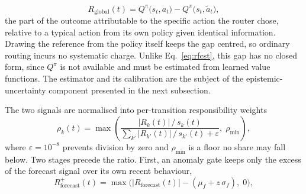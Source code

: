 \documentclass{article} %
\begin{document}
\begin{equation}
R_{\text{global}}(t)=Q^{\pi}\!\big(s_t,a_t\big)-Q^{\pi}\!\big(s_t,\tilde{a}_t\big),
\label{eq:rglobal}
\end{equation}
the part of the outcome attributable to the specific action the router chose, relative to a typical action from its own policy given identical information. Drawing the reference from the policy itself keeps the gap centred, so ordinary routing incurs no systematic charge. Unlike Eq.~\ref{eq:rfcst}, this gap has no closed form, since $Q^{\pi}$ is not available and must be estimated from learned value functions. The estimator and its calibration are the subject of the epistemic-uncertainty component presented in the next subsection.

The two signals are normalised into per-transition responsibility weights
\begin{equation}
\rho_k(t)=\max\!\left(\frac{|R_k(t)|\,/\,s_k(t)}{\sum_{k'}|R_{k'}(t)|\,/\,s_{k'}(t)+\varepsilon},\;
\rho_{\min}\right),
\label{eq:rho}
\end{equation}
where $\varepsilon{=}10^{-8}$ prevents division by zero and $\rho_{\min}$ is a floor no share may fall below. Two stages precede the ratio. First, an anomaly gate keeps only the excess of the forecast signal over its own recent behaviour,
\begin{equation}
R^{+}_{\text{forecast}}(t)=\max\!\big(|R_{\text{forecast}}(t)|-(\mu_f+z\,\sigma_f),\;0\big),
\label{eq:anom}
\end{equation}
\end{document}

